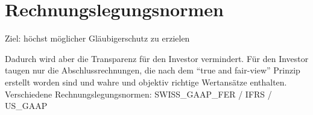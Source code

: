 \section*{Rechnungslegungsnormen}

Ziel: höchst möglicher Gläubigerschutz zu erzielen

Dadurch wird aber die Transparenz für den Investor vermindert. Für
den Investor taugen nur die Abschlussrechnungen, die nach dem ``true
and fair-view'' Prinzip erstellt worden sind und wahre und objektiv
richtige Wertansätze enthalten. Verschiedene Rechnungslegungsnormen:
SWISS\_GAAP\_FER / IFRS / US\_GAAP
